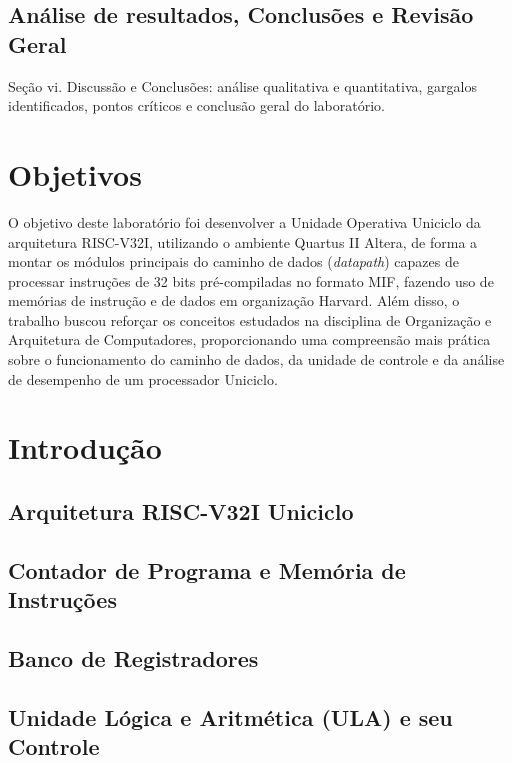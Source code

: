 \documentclass[conference]{IEEEtran}
\begin{document}
\subsection{Análise de resultados, Conclusões e Revisão Geral}
Seção vi. Discussão e Conclusões: análise qualitativa e quantitativa, gargalos identificados, pontos
críticos e conclusão geral do laboratório.


\section{Objetivos}
O objetivo deste laboratório foi desenvolver a Unidade Operativa Uniciclo da arquitetura RISC-V32I,
utilizando o ambiente Quartus II Altera, de forma a montar os módulos principais do caminho de dados
(\textit{datapath}) capazes de processar instruções de 32 bits pré-compiladas no formato MIF, fazendo uso
de memórias de instrução e de dados em organização Harvard. Além disso, o trabalho buscou reforçar os
conceitos estudados na disciplina de Organização e Arquitetura de Computadores, proporcionando uma
compreensão mais prática sobre o funcionamento do caminho de dados, da unidade de controle e da análise de
desempenho de um processador Uniciclo.

\section{Introdução}

\subsection{Arquitetura RISC-V32I Uniciclo}

\subsection{Contador de Programa e Memória de Instruções}

\subsection{Banco de Registradores}

\subsection{Unidade Lógica e Aritmética (ULA) e seu Controle}
\end{document}
